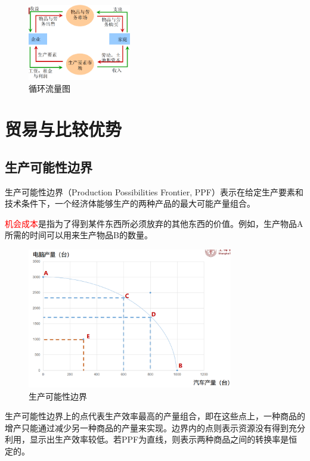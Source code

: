 \documentclass[12pt, a4paper]{article}
\begin{document}
\begin{figure}[H]
  \centering
  \includegraphics[width=0.4\textwidth]{循环流量图.png}
  \caption{循环流量图}
\end{figure}


\newpage
\section{贸易与比较优势}

\subsection{生产可能性边界}
生产可能性边界（Production Possibilities Frontier, PPF）表示在给定生产要素和技术条件下，一个经济体能够生产的两种产品的最大可能产量组合。

\textcolor{red}{机会成本}是指为了得到某件东西所必须放弃的其他东西的价值。例如，生产物品A所需的时间可以用来生产物品B的数量。

\begin{figure}[H] 
  \centering
  \includegraphics[width=0.8\textwidth]{生产可能性边界.png}
  \caption{生产可能性边界}
  \label{fig:ppf}
\end{figure}

生产可能性边界上的点代表生产效率最高的产量组合，即在这些点上，一种商品的增产只能通过减少另一种商品的产量来实现。边界内的点则表示资源没有得到充分利用，显示出生产效率较低。若PPF为直线，则表示两种商品之间的转换率是恒定的。
\end{document}

